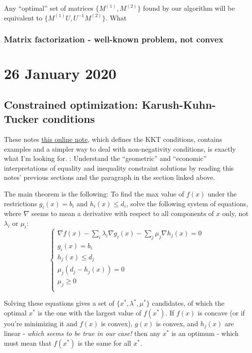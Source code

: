 \documentclass{report}
\begin{document}
Any ``optimal'' set of matrices $\{M^{(1)},M^{(2)}\}$ found by our algorithm will be equivalent to $\{M^{(1)}U, U^{-1}M^{(2)}\}$. What

\subsection{Matrix factorization - well-known problem, not convex}

\chapter{26 January 2020}

\section{Constrained optimization: Karush-Kuhn-Tucker conditions}

These notes \href{https://mat.gsia.cmu.edu/classes/QUANT/NOTES/chap4/node6.html}{this online note}, which defines the KKT conditions, contains examples and a simpler way to deal with non-negativity conditions, is exactly what I'm looking for. \todo: Understand the ``geometric'' and ``economic'' interpretations of equality and inequality constraint solutions by reading this notes' previous sections and the paragraph in the section linked above.

The main theorem is the following: To find the max value of $f(x)$ under the restrictions $g_i(x)=b_i$ and $h_i(x)\leq d_i$, solve the following system of equations, where $\nabla$ seems to mean a derivative with respect to all components of $x$ only, not $\lambda_i$ or $\mu_i$:
\begin{equation}
\begin{cases}
\nabla f(x)-\sum_i\lambda_i\nabla g_i(x)-\sum_j\mu_j\nabla h_j(x)=0\\
g_i(x)=b_i\\
h_j(x)\leq d_j\\
\mu_j(d_j-h_j(x))=0\\
\mu_j\geq 0\\
\end{cases}
\end{equation}

Solving these equations gives a set of $\{x^*,\lambda^*,\mu^*\}$ candidates, of which the optimal $x^*$ is the one with the largest value of $f(x^*)$. If $f(x)$ is concave (or if you're minimizing it and $f(x)$ is convex), $g(x)$ is convex, and $h_j(x)$ are linear - \textit{which seems to be true in our case!} then any $x^*$ is an optimum - which must mean that $f(x^*)$ is the same for all $x^*$.
\end{document}
